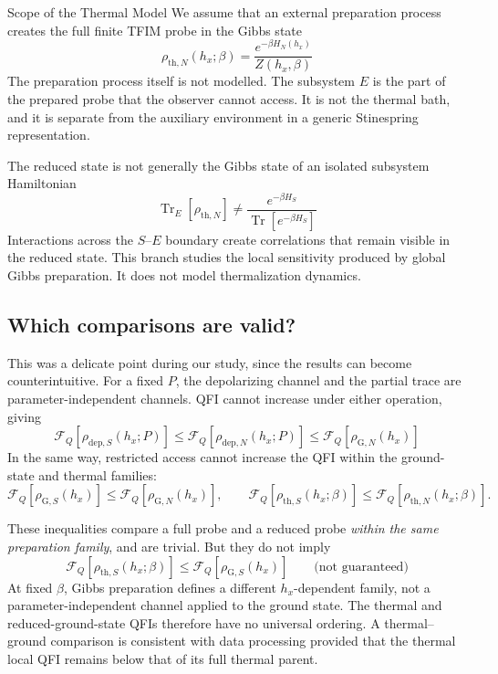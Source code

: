 \begin{infobox}{Scope of the Thermal Model}
    We assume that an external preparation process creates the full finite TFIM probe in the Gibbs state
    \[
        \rho_{\mathrm{th},N}(h_x;\beta)
        =
        \frac{e^{-\beta H_N(h_x)}}{Z(h_x,\beta)}
    \]
    The preparation process itself is not modelled.  The subsystem $E$ is the part of the prepared probe that the observer cannot access.  It is not the thermal bath, and it is separate from the auxiliary environment in a generic Stinespring representation.

    The reduced state is not generally the Gibbs state of an isolated subsystem Hamiltonian
    \[
        \operatorname{Tr}_E[\rho_{\mathrm{th},N}]
        \neq
        \frac{e^{-\beta H_S}}{\operatorname{Tr}[e^{-\beta H_S}]}
    \]
    Interactions across the $S$--$E$ boundary create correlations that remain visible in the reduced state.  This branch studies the local sensitivity produced by global Gibbs preparation.  It does not model thermalization dynamics.
\end{infobox}


\subsection{Which comparisons are valid?}

This was a delicate point during our study, since the results can become counterintuitive.  For a fixed $P$, the depolarizing channel and the partial trace are parameter-independent channels.  QFI cannot increase under either operation, giving
\begin{equation}
    \mathcal{F}_Q[\rho_{\mathrm{dep},S}(h_x;P)]
    \leq \mathcal{F}_Q[\rho_{\mathrm{dep},N}(h_x;P)]
    \leq \mathcal{F}_Q[\rho_{\mathrm{G},N}(h_x)]
    \label{eq:depolarizing_data_processing}
\end{equation}
In the same way, restricted access cannot increase the QFI within the ground-state and thermal families:
\begin{equation}
    \mathcal{F}_Q[\rho_{\mathrm{G},S}(h_x)]
    \leq \mathcal{F}_Q[\rho_{\mathrm{G},N}(h_x)],
    \qquad
    \mathcal{F}_Q[\rho_{\mathrm{th},S}(h_x;\beta)]
    \leq \mathcal{F}_Q[\rho_{\mathrm{th},N}(h_x;\beta)].
    \label{eq:local_global_data_processing}
\end{equation}

These inequalities compare a full probe and a reduced probe \emph{within the same preparation family}, and are trivial. But they do not imply
\begin{equation}
    \mathcal{F}_Q[\rho_{\mathrm{th},S}(h_x;\beta)]
    \leq
    \mathcal{F}_Q[\rho_{\mathrm{G},S}(h_x)]
    \qquad
    \text{(not guaranteed)}
    \label{eq:no_cross_family_qfi_ordering}
\end{equation}
At fixed $\beta$, Gibbs preparation defines a different $h_x$-dependent family, not a parameter-independent channel applied to the ground state.  The thermal and reduced-ground-state QFIs therefore have no universal ordering.  A thermal--ground comparison is consistent with data processing provided that the thermal local QFI remains below that of its full thermal parent.

